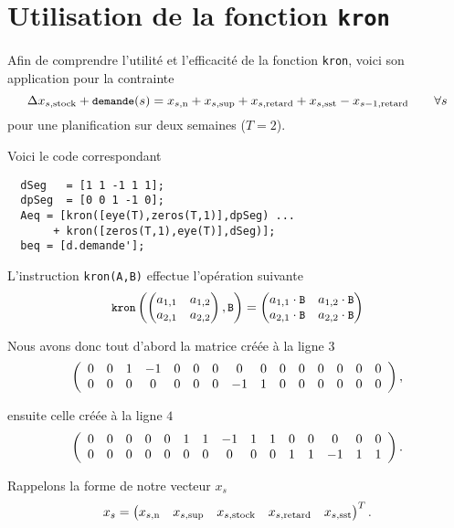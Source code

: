 \section{Utilisation de la fonction \texttt{kron}}
\label{app:kron}

\lstset{language=MATLAB}

Afin de comprendre l'utilité et l'efficacité de la fonction \texttt{kron},
voici son application pour la contrainte
\[ 
  \Delta x_{s,\text{stock}} + {\small\texttt{demande}}(s) = x_{s,\text{n}} + x_{s,\text{sup}} 
  + x_{s,\text{retard}} + x_{s,\text{sst}} - x_{s-1,\text{retard}} \qquad \forall s
\]
pour une planification sur deux semaines ($T=2$).

Voici le code correspondant
\begin{lstlisting}
  dSeg   = [1 1 -1 1 1];
  dpSeg  = [0 0 1 -1 0];
  Aeq = [kron([eye(T),zeros(T,1)],dpSeg) ...
       + kron([zeros(T,1),eye(T)],dSeg)];
  beq = [d.demande'];   
\end{lstlisting}

L'instruction \lstinline{kron(A,B)} effectue l'opération suivante
\[ 
  {\small\texttt{kron}}
    \left(
      \begin{pmatrix} a_{1,1} & a_{1,2} \\ a_{2,1} & a_{2,2} \end{pmatrix}, 
      {\small\texttt{B}}
    \right)
  =
  \begin{pmatrix} a_{1,1} \cdot{\small\texttt{B}} & a_{1,2} \cdot{\small\texttt{B}}
    \\ a_{2,1}\cdot{\small\texttt{B}} & a_{2,2} \cdot{\small\texttt{B}}
  \end{pmatrix}
\]

Nous avons donc tout d'abord la matrice créée à la ligne $3$
\[
    \left(
    \begin{array}{*{15}c}
      0 & 0 & 1 & -1 & 0 & 0 & 0 &  0 & 0 & 0 & 0 & 0 & 0 & 0 & 0 \\
      0 & 0 & 0 &  0 & 0 & 0 & 0 & -1 & 1 & 0 & 0 & 0 & 0 & 0 & 0 
    \end{array}
    \right),
\]

ensuite celle créée à la ligne $4$
\[
    \left(
    \begin{array}{*{15}c}
      0 & 0 & 0 & 0 & 0 & 1 & 1 & -1 & 1 & 1 & 0 & 0 & 0 & 0 & 0 \\
      0 & 0 & 0 & 0 & 0 & 0 & 0 &  0 & 0 & 0 & 1 & 1 & -1 & 1 & 1 
    \end{array}
    \right).
\]


Rappelons la forme de notre vecteur $x_s$
\[ x_s = 
  \begin{pmatrix} 
    x_{s,\text{n}} &x_{s,\text{sup}} &x_{s,\text{stock}} &x_{s,\text{retard}} &x_{s,\text{sst}}
  \end{pmatrix}^T.
\]

